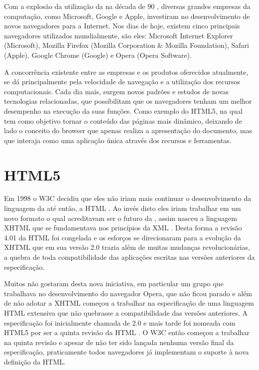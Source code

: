 \documentclass[espaco=simples,appendix=Name]{abnt}
\begin{document}
\begin{description}
Com a explosão da utilização da  na década de 90 \cite{BloombergGameChangers}, diversas grandes empresas da computação, como Microsoft, Google e Apple, investiram no desenvolvimento de novos navegadores para a Internet. Nos dias de hoje, existem cinco principais navegadores utilizados mundialmente, são eles: Microsoft Internet Explorer (Microsoft), Mozilla Firefox (Mozilla Corporation \& Mozilla Foundation), Safari (Apple), Google Chrome (Google) e Opera (Opera Software).

A concorrência existente entre as empresas e os produtos oferecidos atualmente, se dá principalmente pela velocidade de navegação e a utilização dos recursos computacionais. Cada dia mais, surgem novos padrões e estudos de novas tecnologias relacionadas, que possibilitam que os navegadores tenham um melhor desempenho na execução da suas funções. Como exemplo do HTML5, na qual tem como objetivo tornar o conteúdo das páginas mais dinâmico, deixando de lado o conceito do browser que apenas realiza a apresentação do documento, mas que interaja como uma aplicação única através dos recursos e ferramentas. \cite{WebAppPlataform}

\section{HTML5}

\item \noindent
Em 1998 o W3C decidiu que eles não iriam mais continuar o desenvolvimento da linguagem da  até então, a HTML . Ao invés disto eles iriam trabalhar em um novo formato o qual acreditavam ser o futuro da , assim nasceu a linguagem XHTML  que se fundamentava nos princípios da XML . Desta forma a revisão 4.01 da HTML foi congelada e os esforços se direcionaram para a evolução da XHTML que em sua versão 2.0 trazia além de muitas mudanças revolucionárias, a quebra de toda compatibilidade das aplicações escritas nas versões anteriores da especificação.

Muitos não gostaram desta nova iniciativa, em particular um grupo que trabalhava no desenvolvimento do navegador Opera, que não ficou parado e além de não adotar a XHTML começou a trabalhar na especificação de uma linguagem HTML extensiva que não quebrasse a compatibilidade das versões anteriores.  A especificação foi inicialmente chamada de  2.0 e mais tarde foi nomeada com HTML5 por ser a quinta revisão da HTML \cite{HTML5Intro}. O W3C então começou a trabalhar na quinta revisão e apesar de não ter sido lançada nenhuma versão final da especificação, praticamente todos navegadores já implementam o suporte à nova definição da HTML.


\end{description}
\end{document}
